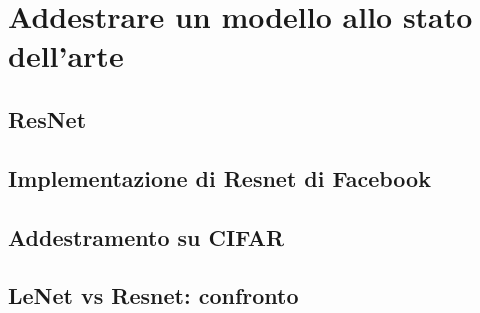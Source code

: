 
\chapter{Addestrare un modello allo stato dell'arte} %

\label{Capitolo5} %


\section{ResNet}



\section{Implementazione di Resnet di Facebook}




\section{Addestramento su CIFAR}

\section{LeNet vs Resnet: confronto}



